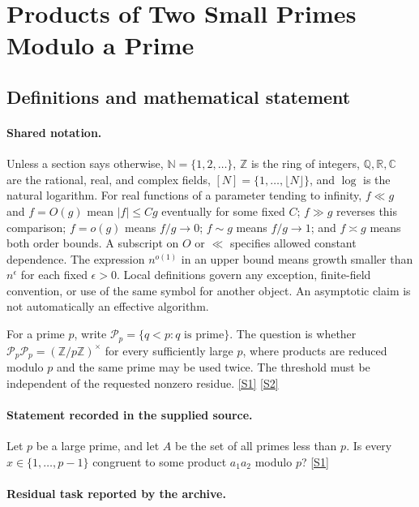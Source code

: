 \documentclass[11pt,a4paper]{article}
\newcommand{\N}{\mathbb{N}}
\newcommand{\Z}{\mathbb{Z}}
\newcommand{\Q}{\mathbb{Q}}
\newcommand{\R}{\mathbb{R}}
\newcommand{\C}{\mathbb{C}}
\newcommand{\sref}[2]{\hyperlink{source:#1:#2}{[S#2]}}
\begin{document}
\section{Products of Two Small Primes Modulo a Prime}\label{statement}


\subsection{Definitions and mathematical statement}

\paragraph{Shared notation.}Unless a section says otherwise, $\N=\{1,2,\ldots\}$,
$\Z$ is the ring of integers, $\Q,\R,\C$ are the rational, real, and complex
fields, $[N]=\{1,\ldots,\lfloor N\rfloor\}$, and $\log$ is the natural
logarithm. For real functions of a parameter tending to infinity,
$f\ll g$ and $f=O(g)$ mean $|f|\leq Cg$ eventually for some fixed $C$;
$f\gg g$ reverses this comparison; $f=o(g)$ means $f/g\to0$;
$f\sim g$ means $f/g\to1$; and $f\asymp g$ means both order bounds.
A subscript on $O$ or $\ll$ specifies allowed constant dependence.
The expression $n^{o(1)}$ in an upper bound means growth smaller than
$n^\epsilon$ for each fixed $\epsilon>0$. Local definitions govern any
exception, finite-field convention, or use of the same symbol for another
object. An asymptotic claim is not automatically an effective algorithm.



For a prime $p$, write $\mathcal P_p=\{q<p:q\text{ is prime}\}$. The question is whether $\mathcal P_p\mathcal P_p=(\Z/p\Z)^\times$ for every sufficiently large $p$, where products are reduced modulo $p$ and the same prime may be used twice. The threshold must be independent of the requested nonzero residue. \sref{statement}{1} \sref{statement}{2}

\paragraph{Statement recorded in the supplied source.}
Let $p$ be a large prime, and let $A$ be the set of all primes less than $p$. Is every $x \in \{1, \dots, p-1\}$ congruent to some product $a_1a_2$ modulo $p$? \sref{statement}{1}

\paragraph{Residual task reported by the archive.}
\end{document}
